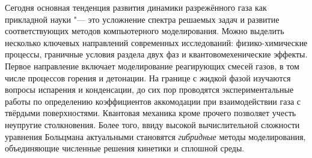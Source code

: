 \documentclass[a4paper, 12pt, oneside]{article} %
\begin{document}
Сегодня основная тенденция развития динамики разрежённого газа как
прикладной науки "--- это усложнение спектра решаемых задач и развитие
соответствующих методов компьютерного моделирования. Можно выделить
несколько ключевых направлений современных исследований:
физико-химические процессы, граничные условия раздела двух фаз и
квантовомехенические эффекты. Первое направление включает моделирование
реагирующих смесей газов, в том числе процессов горения и детонации. На
границе с жидкой фазой изучаются вопросы испарения и конденсации, до сих
пор проводятся экспериментальные работы по определению коэффициентов
аккомодации при взаимодействии газа с твёрдыми поверхностями. Квантовая
механика кроме прочего позволяет учесть неупругие столкновения. Более
того, ввиду высокой вычислительной сложности уравнения Больцмана
актуальными становятся \emph{гибридные} методы моделирования,
объединяющие численные решения кинетики и сплошной среды.


\printbibheading
{}

\printbibliography[
	heading=subbibliography,
	title={Первичные источники}]

\newrefsection[second]
\nocite{*}
\printbibliography[
	nottype=mvbook,
	sorting=nty,
	env=plain,				%
	heading=subbibliography,
	title={Вторичные источники}]
\end{document}
